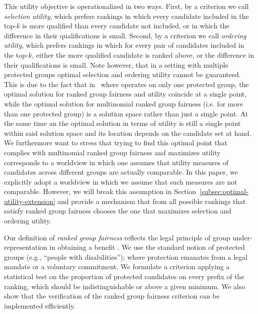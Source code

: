 This utility objective is operationalized in two ways.
%
First, by a criterion we call \emph{selection utility}, which prefers rankings in which every candidate included in the top-$k$ is more qualified than every candidate not included, or in which the difference in their qualifications is small.
%
Second, by a criterion we call \emph{ordering utility}, which prefers rankings in which for every pair of candidates included in the top-$k$, either the more qualified candidate is ranked above, or the difference in their qualifications is small.
%
Note however, that in a setting with multiple protected groups optimal selection and ordering utility cannot be guaranteed. 
%
This is due to the fact that in~\cite{zehlike2017fair} where \algoFAIR operates on only one protected group, the optimal solution for ranked group fairness and utility coincide at a single point, while the optimal solution for multinomial ranked group fairness (i.e. for more than one protected group) is a solution space rather than just a single point. 
%
At the same time an the optimal solution in terms of utility is still a single point within said solution space and its location depends on the candidate set at hand.
%
We furthermore want to stress that trying to find this optimal point that complies with multinomial ranked group fairness and maximizes utility corresponds to a worldview in which one assumes that utility measures of candidates across different groups are actually comparable. 
%
In this paper, we explicitly adopt a worldview in which we assume that such measures are not comparable.
%
However, we will break this assumption in Section~\ref{subsec:optimal-utility-extension} and provide a mechanism that from all possible rankings that satisfy ranked group fairness chooses the one that maximizes selection and ordering utility.

Our definition of \emph{ranked group fairness} reflects the legal principle of group under-representation in obtaining a benefit \cite{ellis2012eu,lerner2003group}. We use the standard notion of protected groups (e.g., ``people with disabilities''); where protection emanates from a legal mandate or a voluntary commitment.
%
%
We formulate a criterion applying a statistical test on the proportion of protected candidates on every prefix of the ranking, which should be indistinguishable or above a given minimum.
%
%
We also show that the verification of the ranked group fairness criterion can be implemented efficiently.

